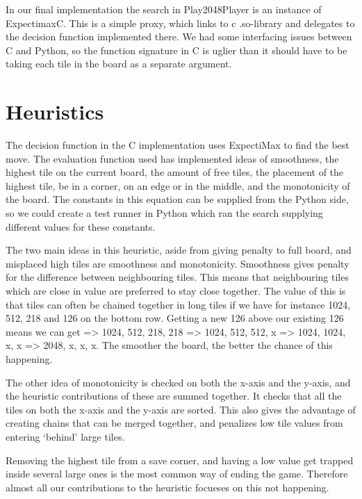 In our final implementation the search in Play2048Player is an instance of
ExpectimaxC. This is a simple proxy, which links to c .so-library and delegates
to the decision function implemented there. We had some interfacing issues between
C and Python, so the function signature in C is uglier than it should have to
be taking each tile in the board as a separate argument.



\section{Heuristics}

The decision function in the C implementation uses ExpectiMax to find the best move.
The evaluation function used has implemented ideas of smoothness, the highest tile
on the current board, the amount of free tiles, the placement of the highest tile,
be in a corner, on an edge or in the middle, and the monotonicity of the board.
The constants in this equation can be supplied from the Python side, so we
could create a test runner in Python which ran the search supplying different
values for these constants.

The two main ideas in this heuristic, aside from giving penalty to full board, and
misplaced high tiles are smoothness and monotonicity. Smoothness gives penalty
for the difference between neighbouring tiles. This means that neighbouring tiles
which are close in value are preferred to stay close together. The value of this is
that tiles can often be chained together in long tiles if we have for instance
1024, 512, 218 and 126 on the bottom row. Getting a new 126 above our existing 126
means we can get => 1024, 512, 218, 218 => 1024, 512, 512, x => 1024, 1024, x, x =>
2048, x, x, x. The smoother the board, the better the chance of this happening.

The other idea of monotonicity is checked on both the x-axis and the y-axis, and
the heuristic contributions of these are summed together. It checks that all the tiles
on both the x-axis and the y-axis are sorted. This also gives the advantage of
creating chains that can be merged together, and penalizes low tile values from
entering `behind' large tiles.

Removing the highest tile from a save corner, and having a low value get trapped
inside several large ones is the most common way of ending the game. Therefore
almost all our contributions to the heuristic focueses on this not happening.
